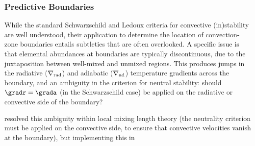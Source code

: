 {\color{brown}
\subsubsection{Predictive Boundaries}

While the standard Schwarzschild and Ledoux criteria for convective (in)stability are well understood, their application to determine the location of convection-zone boundaries entails subtleties that are often overlooked. A specific issue is that elemental abundances at boundaries are typically discontinuous, due to the juxtaposition between well-mixed and unmixed regions. This produces jumps in the radiative ($\nabla_{\rm rad}$) and adiabatic ($\nabla_{\rm ad}$) temperature gradients across the boundary, and an ambiguity in the criterion for neutral stability: should $\gradr=\grada$ (in the Schwarzschild case) be applied on the radiative or convective side of the boundary?

\citet{Gabriel:2014} resolved this ambiguity within local mixing length theory (the neutrality criterion must be applied on the convective side, to ensure that convective velocities vanish at the boundary), but implementing this in 

}